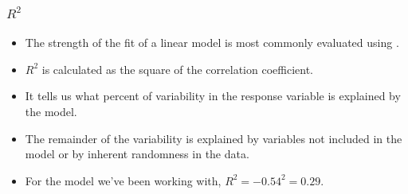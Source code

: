 \documentclass[notes,11pt, aspectratio=169]{beamer}
\begin{document}
\begin{frame}
\frametitle{$R^2$}

\begin{itemize}

\item The strength of the fit of a linear model is most commonly evaluated using .

\pause

\item $R^2$ is calculated as the square of the correlation coefficient.

\pause

\item It tells us what percent of variability in the response variable is explained by the model.

\pause

\item The remainder of the variability is explained by variables not included in the model or by inherent randomness in the data.

\pause

\item For the model we've been working with, $R^2 = -0.54^2 = 0.29$.

\end{itemize}

\end{frame}

\end{document}
